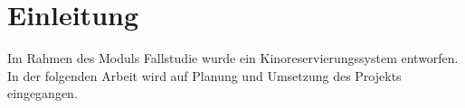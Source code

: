 \chapter{Einleitung}

Im Rahmen des Moduls Fallstudie wurde ein Kinoreservierungssystem entworfen.
In der folgenden Arbeit wird auf Planung und Umsetzung des Projekts eingegangen.